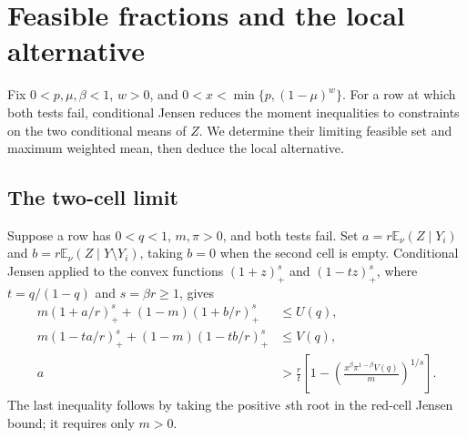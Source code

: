 \section{Feasible fractions and the local alternative}
\label{sec:feasible-fractions}

Fix $0<p,\mu,\beta<1$, $w>0$, and $0<x<\min\{p,(1-\mu)^w\}$.
For a row at which both tests fail, conditional Jensen reduces the
moment inequalities to constraints on the two conditional means of $Z$.
We determine their limiting feasible set and maximum weighted mean,
then deduce the local alternative.

\subsection{The two-cell limit}

Suppose a row has $0<q<1$, $m,\pi>0$, and both tests fail.
Set $a=r\mathbb E_\nu(Z\mid Y_i)$ and
$b=r\mathbb E_\nu(Z\mid Y\setminus Y_i)$, taking $b=0$ when the second
cell is empty. Conditional Jensen applied to the convex functions
$(1+z)_+^s$ and $(1-tz)_+^s$, where $t=q/(1-q)$ and $s=\beta r\ge1$,
gives
\begin{equation}\label{eq:finite-cells}
 \begin{aligned}
 m(1+a/r)_+^s+(1-m)(1+b/r)_+^s&\le U(q),\\
 m(1-ta/r)_+^s+(1-m)(1-tb/r)_+^s&\le V(q),\\
 a&>\frac r t\left[1-
       \left(\frac{x^\beta\pi^{1-\beta}V(q)}m\right)^{1/s}\right].
 \end{aligned}
\end{equation}
The last inequality follows by taking the positive $s$th root in
the red-cell Jensen bound; it requires only $m>0$.

